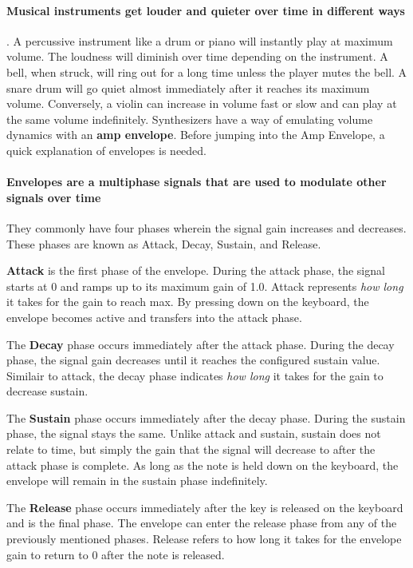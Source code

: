 \documentclass[acmlarge,screen]{acmart}
\begin{document}
	\paragraph{Musical instruments get louder and quieter over time in different ways}. A percussive instrument like a drum or piano will instantly play at maximum volume. The loudness will diminish over time depending on the instrument. A bell, when struck, will ring out for a long time unless the player mutes the bell. A snare drum will go quiet almost immediately after it reaches its maximum volume. Conversely, a violin can increase in volume fast or slow and can play at the same volume indefinitely. Synthesizers have a way of emulating volume dynamics with an \textbf{amp envelope}. Before jumping into the Amp Envelope, a quick explanation of envelopes is needed. 
	
	\paragraph{Envelopes are a multiphase signals that are used to modulate other signals over time} They commonly have four phases wherein the signal gain increases and decreases. These phases are known as Attack, Decay, Sustain, and Release.
	
	\textbf{Attack} is the first phase of the envelope. During the attack phase, the signal starts at 0 and ramps up to its maximum gain of 1.0. Attack represents \textit{how long} it takes for the gain to reach max. By pressing down on the keyboard, the envelope becomes active and transfers into the attack phase.
	
	The \textbf{Decay} phase occurs immediately after the attack phase. During the decay phase, the signal gain decreases until it reaches the configured sustain value. Similair to attack, the decay phase indicates \textit{how long} it takes for the gain to decrease sustain.
	
	The \textbf{Sustain} phase occurs immediately after the decay phase. During the sustain phase, the signal stays the same. Unlike attack and sustain, sustain does not relate to time, but simply the gain that the signal will decrease to after the attack phase is complete. As long as the note is held down on the keyboard, the envelope will remain in the sustain phase indefinitely.
	
	The \textbf{Release} phase occurs immediately after the key is released on the keyboard and is the final phase. The envelope can enter the release phase from any of the previously mentioned phases. Release refers to how long it takes for the envelope gain to return to 0 after the note is released. \cite{hass_2021}
	
\end{document}
